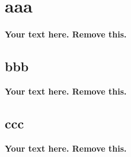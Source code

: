 \documentclass[11pt,a4,twocolumn]{article}
\begin{document}




\section{aaa} 

\textbf{
Your text here.
Remove this.
}
\lipsum[2-3]




\subsection{bbb}

\textbf{
Your text here.
Remove this.
}
\lipsum[2-3]




\subsection{ccc}

\textbf{
Your text here.
Remove this.
}
\lipsum[2-3]










\end{document}
